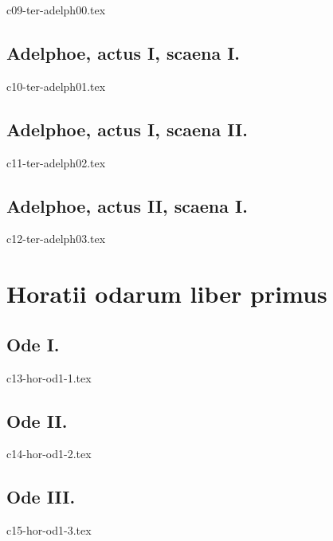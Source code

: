 \documentclass[a4paper,12pt,twoside]{report}
\begin{document}
{c09-ter-adelph00.tex}

\chapter{Adelphoe, actus I, scaena I.}


{c10-ter-adelph01.tex}

\chapter{Adelphoe, actus I, scaena II.}


{c11-ter-adelph02.tex}

\chapter{Adelphoe, actus II, scaena I.}


{c12-ter-adelph03.tex}


\part{Horatii odarum liber primus}

\chapter{Ode I.}


{c13-hor-od1-1.tex}

\chapter{Ode II.}


{c14-hor-od1-2.tex}

\chapter{Ode III.}


{c15-hor-od1-3.tex}



\tableofcontents
\end{document}
